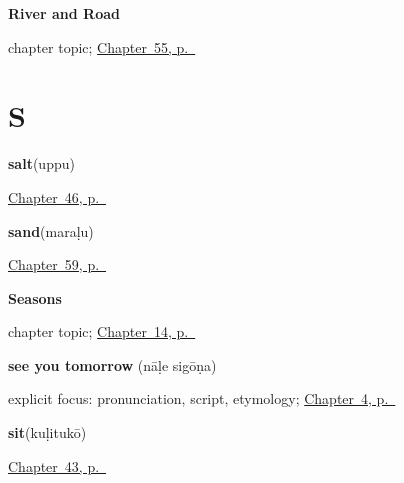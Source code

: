 \noindent\begin{minipage}[t]{\linewidth}
\raggedright
\textbf{River and Road}\par
\footnotesize chapter topic; \hyperref[ch:ka-river-road]{Chapter~55, p.~\pageref*{ch:ka-river-road}}
\end{minipage}\par\smallskip

\section*{S}

\noindent\begin{minipage}[t]{\linewidth}
\raggedright
\textbf{salt}\enspace\emph{}\enspace(uppu)\par
\footnotesize \hyperref[ch:ka-ask-for]{Chapter~46, p.~\pageref*{ch:ka-ask-for}}
\end{minipage}\par\smallskip

\noindent\begin{minipage}[t]{\linewidth}
\raggedright
\textbf{sand}\enspace\emph{}\enspace(maraḷu)\par
\footnotesize \hyperref[ch:ka-weather-ground]{Chapter~59, p.~\pageref*{ch:ka-weather-ground}}
\end{minipage}\par\smallskip

\noindent\begin{minipage}[t]{\linewidth}
\raggedright
\textbf{Seasons}\par
\footnotesize chapter topic; \hyperref[ch:ka-seasons]{Chapter~14, p.~\pageref*{ch:ka-seasons}}
\end{minipage}\par\smallskip

\noindent\begin{minipage}[t]{\linewidth}
\raggedright
\textbf{see you tomorrow}\enspace\emph{ }\enspace(nāḷe sigōṇa)\par
\footnotesize explicit focus: pronunciation, script, etymology; \hyperref[ch:farewells]{Chapter~4, p.~\pageref*{ch:farewells}}
\end{minipage}\par\smallskip

\noindent\begin{minipage}[t]{\linewidth}
\raggedright
\textbf{sit}\enspace\emph{}\enspace(kuḷitukō)\par
\footnotesize \hyperref[ch:ka-more-verbs]{Chapter~43, p.~\pageref*{ch:ka-more-verbs}}
\end{minipage}\par\smallskip

